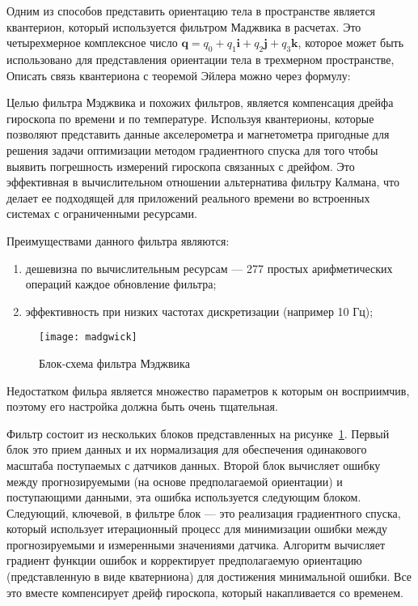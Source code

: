 Одним из способов представить ориентацию тела в пространстве является квантерион, который используется фильтром Маджвика в расчетах.
Это четырехмерное комплексное число $\mathbf{q}=q_{0}+q_{1}\mathbf{i}+q_{2}\mathbf{j}+q_{3}\mathbf{k}$, которое может быть использовано 
для представления ориентации тела в трехмерном пространстве,
Описать связь квантериона с теоремой Эйлера можно через формулу: 


Целью фильтра Мэджвика и похожих фильтров, является компенсация дрейфа гироскопа по времени и по температуре.
Используя квантерионы, которые позволяют представить данные акселерометра и магнетометра пригодные для решения задачи оптимизации 
методом градиентного спуска для того чтобы выявить погрешность измерений гироскопа связанных с дрейфом. Это эффективная в 
вычислительном отношении альтернатива фильтру Калмана, что делает ее подходящей для приложений реального времени во встроенных 
системах с ограниченными ресурсами. 

Преимуществами данного фильтра являются:

\begin{enumerate}
    \item дешевизна по вычислительным ресурсам — 277 простых арифметических операций каждое обновление фильтра;
    \item эффективность при низких частотах дискретизации (например 10 Гц);
\end{enumerate}

\begin{figure}[ht]
    \centering
    \texttt{[image: madgwick]}
    \caption{Блок-схема фильтра Мэджвика}
    \label{pic::domain::madgwick}
\end{figure}

Недостатком фильра является множество параметров к которым он восприимчив, поэтому его настройка должна быть очень тщательная.

Фильтр состоит из нескольких блоков представленных на рисунке~\ref{pic::domain::madgwick}.
Первый блок это прием данных и их нормализация для обеспечения одинакового 
масштаба поступаемых с датчиков данных.
Второй блок вычисляет ошибку между прогнозируемыми (на основе предполагаемой ориентации) и поступающими данными, 
эта ошибка используется следующим блоком.
Следующий, ключевой, в фильтре блок --- это реализация градиентного спуска, который 
использует итерационный процесс для минимизации ошибки между прогнозируемыми и 
измеренными значениями датчика. Алгоритм вычисляет градиент функции ошибок и корректирует
предполагаемую ориентацию (представленную в виде кватерниона) для достижения минимальной ошибки.
Все это вместе компенсирует дрейф гироскопа, который накапливается со временем.

